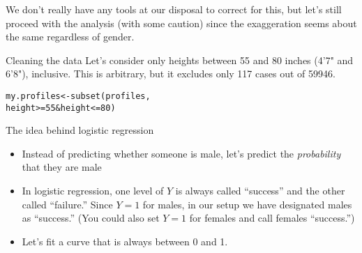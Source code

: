 \documentclass{beamer}\usepackage[]{graphicx}\usepackage[]{color}
\makeatletter
\newcommand{\hlnum}[1]{\textcolor[rgb]{0.824,0.412,0.118}{#1}}%
\newcommand{\hlstr}[1]{\textcolor[rgb]{1,0.894,0.71}{#1}}%
\newcommand{\hlopt}[1]{\textcolor[rgb]{1,0.894,0.769}{#1}}%
\newcommand{\hlstd}[1]{\textcolor[rgb]{1,0.894,0.769}{#1}}%
\newcommand{\hlkwb}[1]{\textcolor[rgb]{0.804,0.776,0.451}{#1}}%
\newcommand{\hlkwc}[1]{\textcolor[rgb]{0.78,0.941,0.545}{#1}}%
\newcommand{\hlkwd}[1]{\textcolor[rgb]{1,0.78,0.769}{#1}}%
\newenvironment{kframe}{%
 \def\at@end@of@kframe{}%
 \ifinner\ifhmode%
  \def\at@end@of@kframe{\end{minipage}}%
  \begin{minipage}{\columnwidth}%
 \fi\fi%
 \def\FrameCommand##1{\hskip\@totalleftmargin \hskip-\fboxsep
 \colorbox{shadecolor}{##1}\hskip-\fboxsep
     \hskip-\linewidth \hskip-\@totalleftmargin \hskip\columnwidth}%
 \MakeFramed {\advance\hsize-\width
   \@totalleftmargin\z@ \linewidth\hsize
   \@setminipage}}%
 {\par\unskip\endMakeFramed%
 \at@end@of@kframe}
\newenvironment{knitrout}{}{} %
\makeatother
\begin{document}
\begin{darkframes}
    \begin{frame}
    \end{frame}

    \begin{frame}
      \begin{center}
        We don't really have any tools at our disposal to correct for this, but let's still proceed with the analysis (with some caution) since the exaggeration seems about the same regardless of gender.
      \end{center}
    \end{frame}


    \begin{frame}[fragile]{Cleaning the data}
      Let's consider only heights between 55 and 80 inches (4'7" and 6'8"), inclusive. This is arbitrary, but it excludes only 117 cases out of 59946.
\begin{knitrout}
\begin{kframe}
\begin{alltt}
\hlstd{my.profiles} \hlkwb{<-} \hlkwd{subset}\hlstd{(profiles,}
                 \hlstd{height} \hlopt{>=} \hlnum{55} \hlopt{&} \hlstd{height} \hlopt{<=} \hlnum{80}\hlstd{)}
\end{alltt}
\end{kframe}
\end{knitrout}
    \end{frame}

    \begin{frame}{The idea behind logistic regression}
      \begin{itemize}
        \item Instead of predicting whether someone is male, let's predict the \emph{probability} that they are male
        \item In logistic regression, one level of $Y$ is always called ``success'' and the other called ``failure.'' Since $Y=1$ for males, in our setup we have designated males as ``success.'' (You could also set $Y=1$ for females and call females ``success.'')
        \item Let's fit a curve that is always between 0 and 1.
      \end{itemize}
    \end{frame}


\end{darkframes}
\end{document}
